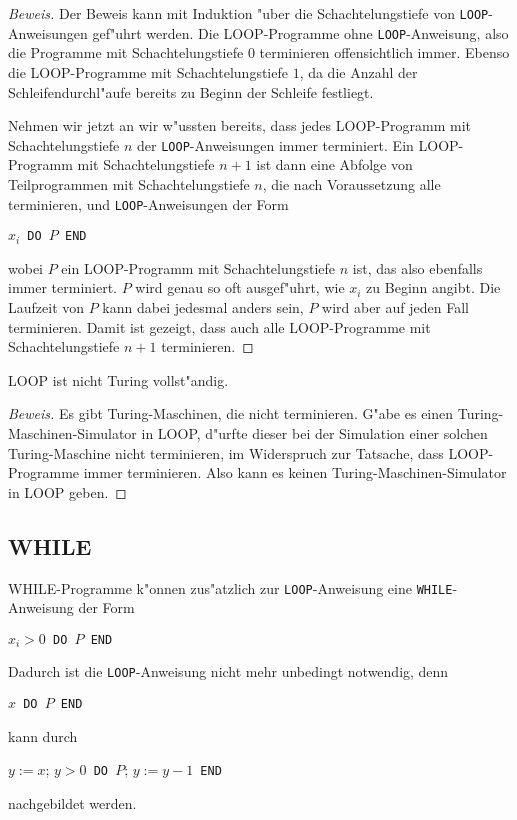 \begin{proof}[Beweis]
Der Beweis kann mit Induktion "uber die Schachtelungstiefe
von {\tt LOOP}-Anweisungen gef"uhrt werden. Die LOOP-Programme
ohne {\tt LOOP}-Anweisung, also die Programme mit Schachtelungstiefe
$0$ terminieren offensichtlich immer. Ebenso die LOOP-Programme
mit Schachtelungstiefe $1$, da die Anzahl der Schleifendurchl"aufe
bereits zu Beginn der Schleife festliegt.

Nehmen wir jetzt an wir w"ussten bereits, dass jedes LOOP-Programm mit
Schachtelungstiefe $n$ der {\tt LOOP}-Anweisungen immer terminiert.
Ein LOOP-Programm mit Schachtelungstiefe $n+1$ ist dann eine
Abfolge von Teilprogrammen mit Schachtelungstiefe $n$, die nach
Voraussetzung alle terminieren, und {\tt LOOP}-Anweisungen der
Form
\begin{algorithmic}
$x_i${\tt\ DO }$P${\tt\ END}
\end{algorithmic}
wobei $P$ ein LOOP-Programm mit Schachtelungstiefe $n$ ist, das also
ebenfalls immer terminiert. $P$ wird genau so oft ausgef"uhrt, wie
$x_i$ zu Beginn angibt. Die Laufzeit von $P$ kann dabei jedesmal
anders sein, $P$ wird aber auf jeden Fall terminieren. Damit ist
gezeigt, dass auch alle LOOP-Programme mit Schachtelungstiefe $n+1$
terminieren.
\end{proof}

\begin{satz}
LOOP ist nicht Turing vollst"andig.
\end{satz}

\begin{proof}[Beweis]
Es gibt Turing-Maschinen, die nicht terminieren. G"abe es einen
Turing-Maschinen-Simulator in LOOP, d"urfte dieser bei der
Simulation einer solchen Turing-Maschine nicht terminieren, im
Widerspruch zur Tatsache, dass LOOP-Programme immer terminieren.
Also kann es keinen Turing-Maschinen-Simulator in LOOP geben.
\end{proof}

\subsection{WHILE}
WHILE-Programme k"onnen zus"atzlich zur {\tt LOOP}-Anweisung
eine {\tt WHILE}-Anweisung der Form
\begin{algorithmic}
$x_i>0${\tt\ DO }$P${\tt\ END}
\end{algorithmic}
Dadurch ist die {\tt LOOP}-Anweisung nicht mehr unbedingt
notwendig, denn 
\begin{algorithmic}
$x${\tt\ DO }$P${\tt\ END}
\end{algorithmic}
kann durch
\begin{algorithmic}
\STATE$y:= x$;
$y>0${\tt\ DO }$P$; $y:=y-1${\tt\ END}
\end{algorithmic}
nachgebildet werden. 

